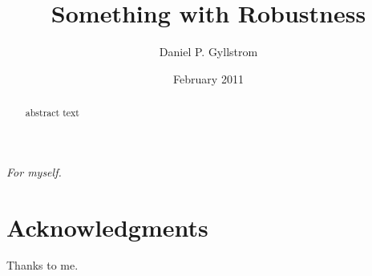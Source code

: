 \documentclass{umthesis}          %
\begin{document}
\title{Something with Robustness}
\author{Daniel P. Gyllstrom}
\date{February 2011} %


\frontmatter
\maketitle
\copyrightpage     %
\signaturepage

\begin{dedication}              %
  \begin{center}
    \emph{For myself.}
  \end{center}
\end{dedication}


\chapter{Acknowledgments}             %
  Thanks to me. 

\begin{abstract}                %
abstract text

\end{abstract}


\tableofcontents                %
\listoftables                   %
\listoffigures                  %


\mainmatter   %
\end{document}

